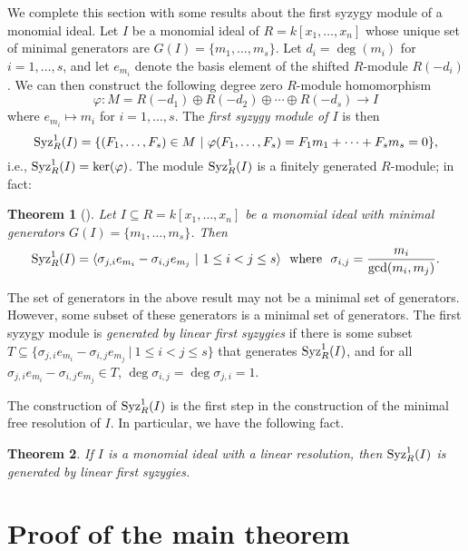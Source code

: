 \documentclass[12pt]{amsart}
\numberwithin{equation}{section}
\newtheorem{theorem}{Theorem}[section]
\theoremstyle{definition}
\begin{document}
We complete this section with some results about the first syzygy module 
of a monomial ideal.  Let $I$ be a monomial ideal of $R = k[x_1,\ldots,x_n]$
whose unique set of minimal generators are $G(I) = \{m_1,\ldots,m_s\}$.
Let $d_i = \deg(m_i)$ for $i=1,\ldots,s$, and let $e_{m_i}$ denote
the basis element of the shifted $R$-module $R(-d_i)$.
We can then construct the
following degree zero $R$-module homomorphism
\[\varphi: M = R(-d_1) \oplus R(-d_2) \oplus \cdots \oplus R(-d_s) \longrightarrow
I\]
where $e_{m_i} \mapsto m_i$   for $i=1,\ldots,s$.
The {\it first syzygy module of $I$} is then
\[{\rm Syz}^1_R(I) = \{(F_1,\ldots,F_s) \in  M ~|~ \varphi(F_1,\ldots,F_s)
= F_1m_1+\cdots + F_sm_s = 0\},\]
i.e., ${\rm Syz}^1_R(I) = {\rm ker}(\varphi)$.   
The module ${\rm Syz}^1_R(I)$ is a finitely generated $R$-module; in fact:

\begin{theorem}[{\cite[Corollary 4.13]{EH}}]\label{generatorsSYZ}
Let $I \subseteq R = k[x_1,\ldots,x_n]$ be
a monomial ideal with minimal generators $G(I) = \{m_1,\ldots,m_s\}$.
Then
\[{\rm Syz}^1_R(I) = \langle \sigma_{j,i}e_{m_i} - \sigma_{i,j}e_{m_j} ~|~
1 \leq i < j \leq s \rangle
~~\mbox{where}~~\sigma_{i,j} =  \frac{m_i}{{\rm gcd}(m_i,m_j)}.\] 
\end{theorem}

The set of generators in the above result may not be a 
minimal set of generators.   However, some subset of these
generators is a minimal set of generators.   
The first syzygy module is {\it generated by linear first syzygies} 
if there is some subset $T \subseteq 
\{ \sigma_{j,i}e_{m_i} - \sigma_{i,j}e_{m_j} ~|~
1 \leq i < j \leq s \}$ that generates ${\rm Syz}_R^1(I)$, 
and for all $\sigma_{j,i}e_{m_i} - \sigma_{i,j}e_{m_j} \in T$,
$\deg \sigma_{i,j} = \deg \sigma_{j,i} = 1$.    

The construction of ${\rm Syz}_R^1(I)$ is the first step
in the construction of the minimal free resolution of $I$.  In
particular, we have the following fact.

\begin{theorem}\label{firstSYZ}  
If $I$ is a monomial ideal with a linear resolution,
then ${\rm Syz}_R^1(I)$ is generated by linear first syzygies.
\end{theorem}


\section{Proof of the main theorem}
\end{document}
